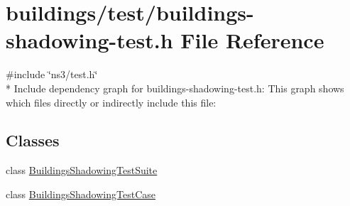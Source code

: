 \hypertarget{buildings-shadowing-test_8h}{}\section{buildings/test/buildings-\/shadowing-\/test.h File Reference}
\label{buildings-shadowing-test_8h}
{\ttfamily \#include \char`\"{}ns3/test.\+h\char`\"{}}\\*
Include dependency graph for buildings-\/shadowing-\/test.h\+:
This graph shows which files directly or indirectly include this file\+:
\subsection*{Classes}
\begin{DoxyCompactItemize}
\item 
class \hyperlink{classBuildingsShadowingTestSuite}{Buildings\+Shadowing\+Test\+Suite}
\item 
class \hyperlink{classBuildingsShadowingTestCase}{Buildings\+Shadowing\+Test\+Case}
\end{DoxyCompactItemize}
